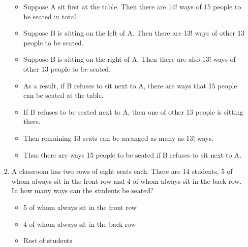 \documentclass[12pt]{article}
\begin{document}
\begin{enumerate}
    \begin{itemize}
        \item Suppose A sit first at the table. Then there are 14! ways of 15 people to be seated in total.
        \item Suppose B is sitting on the left of A. Then there are 13! ways of other 13 people to be seated.
        \item Suppose B is sitting on the right of A. Then there are also 13! ways of other 13 people to be seated.
        \item As a result, if B refuses to sit next to A, there are  ways that 15 people can be seated at the table.\\
        
        \item If B refuses to be seated next to A, then one of other 13 people is sitting there. \item Then remaining 13 seats can be arranged as many as 13! ways.
        \item Thus there are  ways 15 people to be seated if B refuses to sit next to A.
    \end{itemize}
    
    \vspace{2\baseslineskip}
    \item A classroom has two rows of eight seats each. There are 14 students, 5 of whom always sit in the front row and 4 of whom always sit in the back row. In how many ways can the students be seated?\\
    
    \begin{itemize}
        \item 5 of whom always sit in the front row\\
        
        \item 4 of whom always sit in the back row\\
        
        \item Rest of students\\
        \\
        
    \end{itemize}
    

\end{enumerate}
\end{document}

